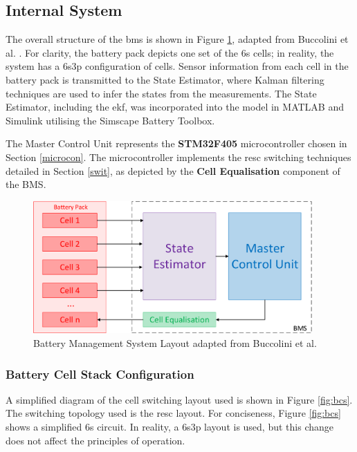 \subsection{Internal System}

The overall structure of the \acrshort{bms} is shown in Figure \ref{fig:bms_layout}, adapted from Buccolini et al. \cite{7555475}. For clarity, the battery pack depicts one set of the \acrshort{6s} cells; in reality, the system has a \acrshort{6s3p} configuration of cells. Sensor information from each cell in the battery pack is transmitted to the State Estimator, where Kalman filtering techniques are used to infer the states from the measurements. The State Estimator, including the \gls{ekf}, was incorporated into the model in MATLAB and Simulink utilising the Simscape Battery Toolbox.

The Master Control Unit represents the \textbf{STM32F405} microcontroller chosen in Section \ref{microcon}. The microcontroller implements the \gls{resc} switching techniques detailed in Section \ref{swit}, as depicted by the \textbf{Cell Equalisation} component of the BMS.

\begin{figure}[H]
  \centering
  \vspace{5mm}
  \includegraphics[width=0.95\textwidth]{figs/Samuel/Figures/BMS Internal (1)-cropped.pdf}
  \caption[Battery Management System Layout]{Battery Management System Layout adapted from Buccolini et al. \cite{7555475}}
  \label{fig:bms_layout}
\end{figure}






\subsubsection{Battery Cell Stack Configuration}

A simplified diagram of the cell switching layout used is shown in Figure \ref{fig:bcs}. The switching topology used is the \gls{resc} layout. For conciseness, Figure \ref{fig:bcs} shows a simplified \gls{6s} circuit. In reality, a \gls{6s3p} layout is used, but this change does not affect the principles of operation. 


